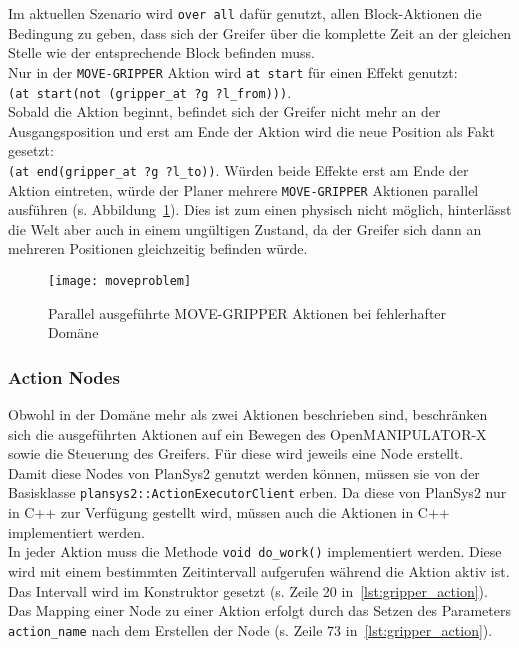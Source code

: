 Im aktuellen Szenario wird \verb|over all| dafür genutzt, allen Block-Aktionen die Bedingung zu geben, dass sich der Greifer über die komplette Zeit an der gleichen Stelle wie der entsprechende Block befinden muss.\\
Nur in der \verb|MOVE-GRIPPER| Aktion wird \verb|at start| für einen Effekt genutzt:\\
\verb|(at start(not (gripper_at ?g ?l_from)))|.\\
Sobald die Aktion beginnt, befindet sich der Greifer nicht mehr an der Ausgangsposition und erst am Ende der Aktion wird die neue Position als Fakt gesetzt:\\
\verb|(at end(gripper_at ?g ?l_to))|.
Würden beide Effekte erst am Ende der Aktion eintreten, würde der Planer mehrere \verb|MOVE-GRIPPER| Aktionen parallel ausführen (s. Abbildung~\ref{fig:tempgrippereffect}).
Dies ist zum einen physisch nicht möglich, hinterlässt die Welt aber auch in einem ungültigen Zustand, da der Greifer sich dann an mehreren Positionen gleichzeitig befinden würde.
\begin{figure}[ht!]
    \centering
    \texttt{[image: moveproblem]}
    \caption{Parallel ausgeführte MOVE-GRIPPER Aktionen bei fehlerhafter Domäne}
    \label{fig:tempgrippereffect}
\end{figure}

\subsubsection{Action Nodes}
Obwohl in der Domäne mehr als zwei Aktionen beschrieben sind, beschränken sich die ausgeführten Aktionen auf ein Bewegen des OpenMANIPULATOR-X sowie die Steuerung des Greifers.
Für diese wird jeweils eine Node erstellt.\\
Damit diese Nodes von \ac{PlanSys2} genutzt werden können, müssen sie von der Basisklasse \verb|plansys2::ActionExecutorClient| erben.
Da diese von \ac{PlanSys2} nur in C++ zur Verfügung gestellt wird, müssen auch die Aktionen in C++ implementiert werden.\\
In jeder Aktion muss die Methode \verb|void do_work()| implementiert werden.
Diese wird mit einem bestimmten Zeitintervall aufgerufen während die Aktion aktiv ist.
Das Intervall wird im Konstruktor gesetzt (s. Zeile 20 in~\ref{lst:gripper_action}).
Das Mapping einer Node zu einer Aktion erfolgt durch das Setzen des Parameters \verb|action_name| nach dem Erstellen der Node (s. Zeile 73 in~\ref{lst:gripper_action}).

